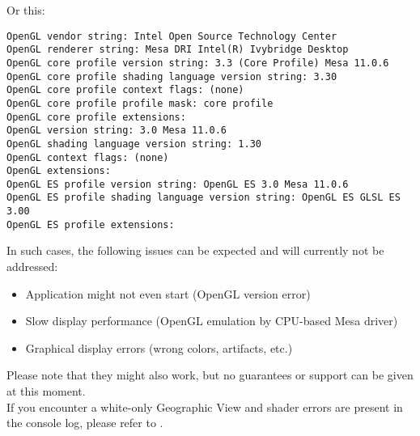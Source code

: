 Or this:

\begin{lstlisting}
OpenGL vendor string: Intel Open Source Technology Center
OpenGL renderer string: Mesa DRI Intel(R) Ivybridge Desktop 
OpenGL core profile version string: 3.3 (Core Profile) Mesa 11.0.6
OpenGL core profile shading language version string: 3.30
OpenGL core profile context flags: (none)
OpenGL core profile profile mask: core profile
OpenGL core profile extensions:
OpenGL version string: 3.0 Mesa 11.0.6
OpenGL shading language version string: 1.30
OpenGL context flags: (none)
OpenGL extensions:
OpenGL ES profile version string: OpenGL ES 3.0 Mesa 11.0.6
OpenGL ES profile shading language version string: OpenGL ES GLSL ES 3.00
OpenGL ES profile extensions:
\end{lstlisting}

In such cases, the following issues can be expected and will currently not be addressed:

\begin{itemize} 
\item Application might not even start (OpenGL version error)
\item Slow display performance (OpenGL emulation by CPU-based Mesa driver)
\item Graphical display errors (wrong colors, artifacts, etc.) 
\end{itemize} 

Please note that they might also work, but no guarantees or support can be given at this moment. \\

If you encounter a white-only Geographic View and shader errors are present in the console log, please refer to .


